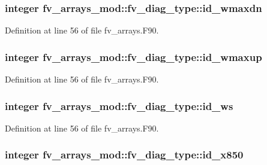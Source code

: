 \subsubsection[{id\-\_\-wmaxdn}]{\setlength{\rightskip}{0pt plus 5cm}integer fv\-\_\-arrays\-\_\-mod\-::fv\-\_\-diag\-\_\-type\-::id\-\_\-wmaxdn}\label{structfv__arrays__mod_1_1fv__diag__type_a43b6b72088ddaee3abaea9c208ad3e10}


Definition at line 56 of file fv\-\_\-arrays.\-F90.

\subsubsection[{id\-\_\-wmaxup}]{\setlength{\rightskip}{0pt plus 5cm}integer fv\-\_\-arrays\-\_\-mod\-::fv\-\_\-diag\-\_\-type\-::id\-\_\-wmaxup}\label{structfv__arrays__mod_1_1fv__diag__type_aac6313c84ac8bc310b14b988bf98f43c}


Definition at line 56 of file fv\-\_\-arrays.\-F90.

\subsubsection[{id\-\_\-ws}]{\setlength{\rightskip}{0pt plus 5cm}integer fv\-\_\-arrays\-\_\-mod\-::fv\-\_\-diag\-\_\-type\-::id\-\_\-ws}\label{structfv__arrays__mod_1_1fv__diag__type_a6118c6a47c51491af5870b9276e7b634}


Definition at line 56 of file fv\-\_\-arrays.\-F90.

\subsubsection[{id\-\_\-x850}]{\setlength{\rightskip}{0pt plus 5cm}integer fv\-\_\-arrays\-\_\-mod\-::fv\-\_\-diag\-\_\-type\-::id\-\_\-x850}\label{structfv__arrays__mod_1_1fv__diag__type_ac19d090d94eaa1059f0f7990d503d798}


